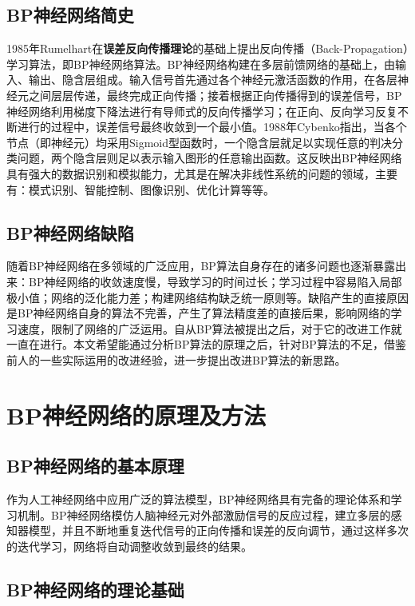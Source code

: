 \documentclass[UTF8]{ctexart}
\begin{document}
\subsection{BP神经网络简史}
1985年Rumelhart在\textbf{误差反向传播理论}的基础上提出反向传播（Back-Propagation）学习算法，即BP神经网络算法。BP神经网络构建在多层前馈网络的基础上，由输入、输出、隐含层组成。输入信号首先通过各个神经元激活函数的作用，在各层神经元之间层层传递，最终完成正向传播；接着根据正向传播得到的误差信号，BP神经网络利用梯度下降法进行有导师式的反向传播学习；在正向、反向学习反复不断进行的过程中，误差信号最终收敛到一个最小值。1988年Cybenko指出，当各个节点（即神经元）均采用Sigmoid型函数时，一个隐含层就足以实现任意的判决分类问题，两个隐含层则足以表示输入图形的任意输出函数。这反映出BP神经网络具有强大的数据识别和模拟能力，尤其是在解决非线性系统的问题的领域，主要有：模式识别、智能控制、图像识别、优化计算等等。 \par
\subsection{BP神经网络缺陷}
随着BP神经网络在多领域的广泛应用，BP算法自身存在的诸多问题也逐渐暴露出来：BP神经网络的收敛速度慢，导致学习的时间过长；学习过程中容易陷入局部极小值；网络的泛化能力差；构建网络结构缺乏统一原则等。缺陷产生的直接原因是BP神经网络自身的算法不完善，产生了算法精度差的直接后果，影响网络的学习速度，限制了网络的广泛运用。自从BP算法被提出之后，对于它的改进工作就一直在进行。本文希望能通过分析BP算法的原理之后，针对BP算法的不足，借鉴前人的一些实际运用的改进经验，进一步提出改进BP算法的新思路。

\section{BP神经网络的原理及方法}

\subsection{BP神经网络的基本原理}

作为人工神经网络中应用广泛的算法模型，BP神经网络具有完备的理论体系和学习机制。BP神经网络模仿人脑神经元对外部激励信号的反应过程，建立多层的感知器模型，并且不断地重复迭代信号的正向传播和误差的反向调节，通过这样多次的迭代学习，网络将自动调整收敛到最终的结果。

\subsection{BP神经网络的理论基础}
\end{document}
